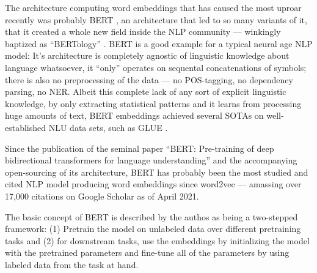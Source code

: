 The architecture computing word embeddings that has caused the most uproar
recently was probably BERT \cite{devlin2018bert}, an architecture that led to so
many variants of it, that it created a whole new field inside the NLP community
--- winkingly baptized as ``BERTology'' \cite{rogers2020primer}. BERT is a good
example for a typical neural age NLP model: It's architecture is completely
agnostic of linguistic knowledge about language whatsoever, it ``only'' operates
on sequental concatenations of symbols; there is also no preprocessing of the
data --- no POS-tagging, no dependency parsing, no NER.
Albeit this complete lack of any sort of explicit linguistic knowledge, by only
extracting statistical patterns and it learns from processing huge amounts of text,
BERT embeddings achieved several SOTAs on well-established NLU data sets, such
as GLUE \cite{wang2018glue}.

Since the publication of the seminal paper ``BERT: Pre-training of deep bidirectional
transformers for language understanding'' \cite{devlin2018bert} and the accompanying
open-sourcing of its architecture,
BERT has probably been the most studied and cited NLP model producing word embeddings since
word2vec \cite{mikolov2013distributed} --- amassing over 17,000 citations on Google Scholar
as of April 2021.

The basic concept of BERT is described by the authos as being a two-stepped
framework: (1) Pretrain the model on unlabeled data over different pretraining
tasks and
(2) for downstream tasks, use the embeddings by initializing the model with
the pretrained parameters and fine-tune all of the parameters by using labeled
data from the task at hand.

